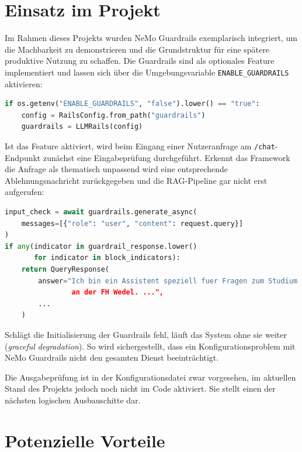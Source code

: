 \section{Einsatz im Projekt}

Im Rahmen dieses Projekts wurden NeMo Guardrails exemplarisch integriert, um die Machbarkeit
zu demonstrieren und die Grundstruktur für eine spätere produktive Nutzung zu schaffen.
Die Guardrails sind als optionales Feature implementiert und lassen sich über die
Umgebungsvariable \texttt{ENABLE\_GUARDRAILS} aktivieren:

\begin{lstlisting}[language=Python, caption={Initialisierung der Guardrails beim Start der API}]
if os.getenv("ENABLE_GUARDRAILS", "false").lower() == "true":
    config = RailsConfig.from_path("guardrails")
    guardrails = LLMRails(config)
\end{lstlisting}

Ist das Feature aktiviert, wird beim Eingang einer Nutzeranfrage am \texttt{/chat}-Endpunkt zunächst
eine Eingabeprüfung durchgeführt. Erkennt das Framework die Anfrage als thematisch unpassend wird eine entsprechende Ablehnungsnachricht
zurückgegeben und die RAG-Pipeline gar nicht erst aufgerufen:

\begin{lstlisting}[language=Python, caption={Eingabeprüfung im Chat-Endpunkt}]
input_check = await guardrails.generate_async(
    messages=[{"role": "user", "content": request.query}]
)
if any(indicator in guardrail_response.lower()
       for indicator in block_indicators):
    return QueryResponse(
        answer="Ich bin ein Assistent speziell fuer Fragen zum Studium
                an der FH Wedel. ...",
        ...
    )
\end{lstlisting}

Schlägt die Initialisierung der Guardrails fehl, läuft das System ohne sie weiter (\emph{graceful degradation}).
So wird sichergestellt, dass ein Konfigurationsproblem mit NeMo Guardrails nicht den gesamten Dienst
beeinträchtigt.

Die Ausgabeprüfung ist in der Konfigurationsdatei zwar vorgesehen, im aktuellen Stand des Projekts
jedoch noch nicht im Code aktiviert. Sie stellt einen der nächsten logischen Ausbauschitte dar.

\section{Potenzielle Vorteile}


